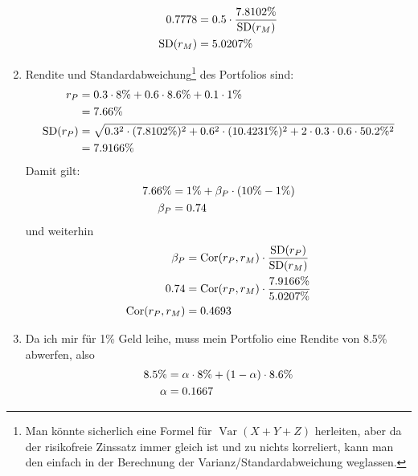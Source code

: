 \documentclass{article}
\DeclareMathOperator{\Var}{Var}
\DeclareMathOperator{\SD}{SD}
\DeclareMathOperator{\Cor}{Cor}
\begin{document}
\begin{enumerate}[label=(\alph*)]
\begin{align}
			0.7778 &= 0.5\cdot \frac{7.8102\%}{\SD(r_M)} \notag \\
			\SD(r_M) &= 5.0207\% \notag
		\end{align}
		\item Rendite und Standardabweichung\footnote{Man könnte sicherlich eine Formel für $\Var(X+Y+Z)$ herleiten, aber da der risikofreie Zinssatz immer gleich ist und zu nichts korreliert, kann man den einfach in der Berechnung der Varianz/Standardabweichung weglassen.} des Portfolios sind:
		\begin{align}
			r_P &= 0.3\cdot 8\% + 0.6\cdot 8.6\% + 0.1\cdot 1\% \notag \\
			&= 7.66\%\notag \\
			\SD(r_P) &= \sqrt{0.3^2\cdot (7.8102\%)^2 + 0.6^2\cdot (10.4231\%)^2 + 2\cdot 0.3\cdot 0.6\cdot 50.2\%^2} \notag \\
			&= 7.9166 \% \notag
		\end{align}
		Damit gilt:
		\begin{align}
			7.66\% &= 1\% + \beta_P\cdot (10\% - 1\%) \notag \\
			\beta_P &= 0.74 \notag
		\end{align}
		und weiterhin
		\begin{align}
			\beta_P &= \Cor(r_P, r_M)\cdot\frac{\SD(r_P)}{\SD(r_M)} \notag \\
			0.74 &= \Cor(r_P, r_M)\cdot\frac{7.9166\%}{5.0207\%} \notag \\
			\Cor(r_P, r_M) &= 0.4693 \notag
		\end{align}
		\item Da ich mir für 1\% Geld leihe, muss mein Portfolio eine Rendite von 8.5\% abwerfen, also
		\begin{align}
			8.5\% &= \alpha \cdot 8\% + (1-\alpha)\cdot 8.6\% \notag \\
			\alpha &= 0.1667 \notag
		\end{align}
	\end{enumerate}
	
\end{document}
